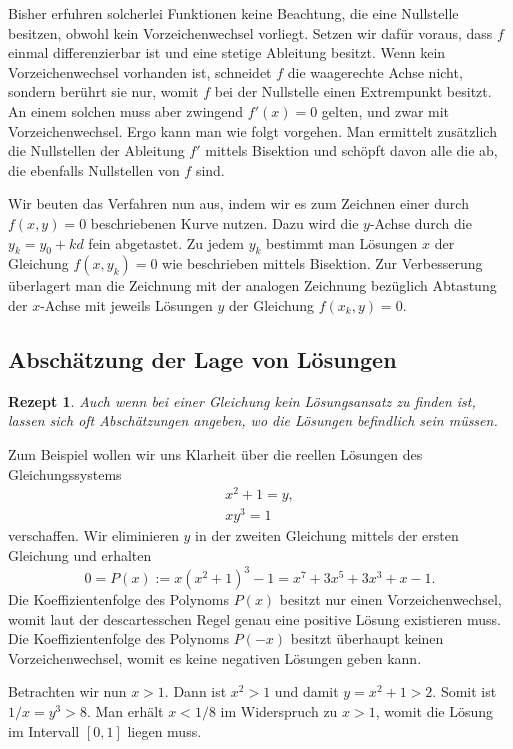 \documentclass[a4paper,10pt,fleqn,twocolumn,twoside,dvipdfmx]{scrartcl}
\theoremstyle{rmbox}
\newtheorem{Rezept}{Rezept}[section]
\begin{document}
Bisher erfuhren solcherlei Funktionen keine Beachtung, die eine
Nullstelle besitzen, obwohl kein Vorzeichenwechsel vorliegt.
Setzen wir dafür voraus, dass $f$ einmal differenzierbar ist und
eine stetige Ableitung besitzt. Wenn kein Vorzeichenwechsel
vorhanden ist, schneidet $f$ die waagerechte Achse nicht,
sondern berührt sie nur, womit $f$ bei der Nullstelle einen
Extrempunkt besitzt. An einem solchen muss aber zwingend $f'(x)=0$
gelten, und zwar mit Vorzeichenwechsel. Ergo kann man wie folgt
vorgehen. Man ermittelt zusätzlich die Nullstellen der Ableitung $f'$
mittels Bisektion und schöpft davon alle die ab, die ebenfalls
Nullstellen von $f$ sind.

Wir beuten das Verfahren nun aus, indem wir es zum Zeichnen einer
durch $f(x,y)=0$ beschriebenen Kurve nutzen. Dazu wird die
$y$-Achse durch die $y_k=y_0+kd$ fein abgetastet. Zu jedem $y_k$
bestimmt man Lösungen $x$ der Gleichung $f(x,y_k)=0$ wie beschrieben
mittels Bisektion. Zur Verbesserung überlagert man die Zeichnung mit
der analogen Zeichnung bezüglich Abtastung der $x$-Achse mit jeweils
Lösungen $y$ der Gleichung $f(x_k,y)=0$.

\newpage
\subsection{Abschätzung der Lage von Lösungen}

\begin{Rezept}
Auch wenn bei einer Gleichung kein Lösungsansatz zu finden ist,
lassen sich oft Abschätzungen angeben, wo die Lösungen
befindlich sein müssen.
\end{Rezept}

\noindent
Zum Beispiel wollen wir uns Klarheit über die reellen Lösungen des
Gleichungssystems
\begin{gather*}
x^2 + 1 = y,\\
xy^3 = 1
\end{gather*}
verschaffen. Wir eliminieren $y$ in der zweiten Gleichung
mittels der ersten Gleichung und erhalten
\[0 = P(x) := x(x^2+1)^3 - 1 = x^7+3x^5+3x^3+x-1.\]
Die Koeffizientenfolge des Polynoms $P(x)$ besitzt nur einen
Vorzeichenwechsel, womit laut der descartesschen
Regel \cite{DR1}\cite{DR2} genau eine
positive Lösung existieren muss. Die Koeffizientenfolge des Polynoms
$P(-x)$ besitzt überhaupt keinen Vorzeichenwechsel, womit es
keine negativen Lösungen geben kann.

Betrachten wir nun $x>1$. Dann ist $x^2>1$ und damit $y=x^2+1>2$.
Somit ist $1/x=y^3>8$. Man erhält $x<1/8$ im Widerspruch zu $x>1$,
womit die Lösung im Intervall $[0,1]$ liegen muss.
\end{document}
